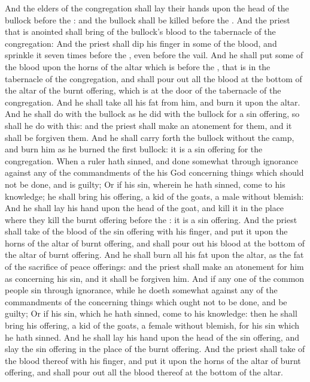 \begin{biblechapter}
\verse And the elders of the congregation shall lay their hands upon the head of the bullock before the \LORD: and the bullock shall be killed before the \LORD.
\verse And the priest that is anointed shall bring of the bullock's blood to the tabernacle of the congregation:
\verse And the priest shall dip his finger in some of the blood, and sprinkle it seven times before the \LORD, even before the vail.
\verse And he shall put some of the blood upon the horns of the altar which is before the \LORD, that is in the tabernacle of the congregation, and shall pour out all the blood at the bottom of the altar of the burnt offering, which is at the door of the tabernacle of the congregation.
\verse And he shall take all his fat from him, and burn it upon the altar.
\verse And he shall do with the bullock as he did with the bullock for a sin offering, so shall he do with this: and the priest shall make an atonement for them, and it shall be forgiven them.
\verse And he shall carry forth the bullock without the camp, and burn him as he burned the first bullock: it is a sin offering for the congregation.
\verse When a ruler hath sinned, and done somewhat through ignorance against any of the commandments of the \LORD his God concerning things which should not be done, and is guilty;
\verse Or if his sin, wherein he hath sinned, come to his knowledge; he shall bring his offering, a kid of the goats, a male without blemish:
\verse And he shall lay his hand upon the head of the goat, and kill it in the place where they kill the burnt offering before the \LORD: it is a sin offering.
\verse And the priest shall take of the blood of the sin offering with his finger, and put it upon the horns of the altar of burnt offering, and shall pour out his blood at the bottom of the altar of burnt offering.
\verse And he shall burn all his fat upon the altar, as the fat of the sacrifice of peace offerings: and the priest shall make an atonement for him as concerning his sin, and it shall be forgiven him.
\verse And if any one of the common people sin through ignorance, while he doeth somewhat against any of the commandments of the \LORD concerning things which ought not to be done, and be guilty;
\verse Or if his sin, which he hath sinned, come to his knowledge: then he shall bring his offering, a kid of the goats, a female without blemish, for his sin which he hath sinned.
\verse And he shall lay his hand upon the head of the sin offering, and slay the sin offering in the place of the burnt offering.
\verse And the priest shall take of the blood thereof with his finger, and put it upon the horns of the altar of burnt offering, and shall pour out all the blood thereof at the bottom of the altar.

\end{biblechapter}
